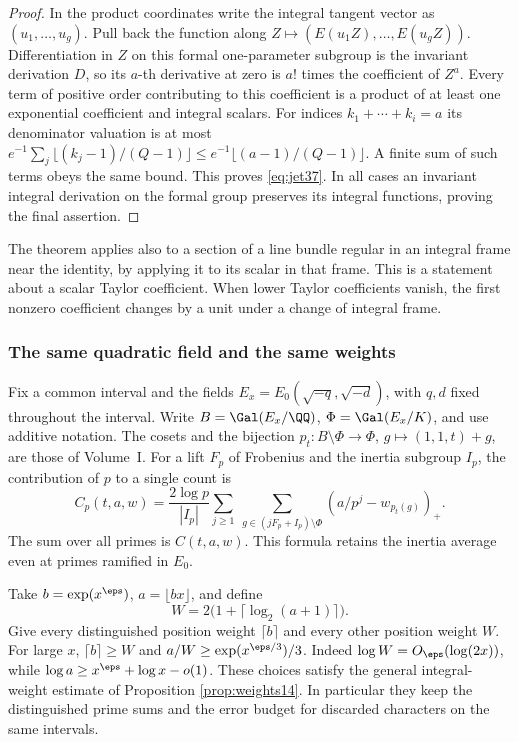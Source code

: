 \documentclass[a4paper,11pt]{article}
\theoremstyle{definition}
\theoremstyle{remark}
\numberwithin{equation}{section}
\begin{document}
\begin{proof}
In the product coordinates write the integral tangent vector as \((u_1,\ldots,u_g)\). Pull back the function along \(Z\mapsto(E(u_1Z),\ldots,E(u_g Z))\). Differentiation in \(Z\) on this formal one-parameter subgroup is the invariant derivation \(D\), so its \(a\)-th derivative at zero is \(a!\) times the coefficient of \(Z^a\). Every term of positive order contributing to this coefficient is a product of at least one exponential coefficient and integral scalars. For indices \(k_1+\cdots+k_i=a\) its denominator valuation is at most \(e^{-1}\sum_j\lfloor(k_j-1)/(Q-1)\rfloor\le e^{-1}\lfloor(a-1)/(Q-1)\rfloor\). A finite sum of such terms obeys the same bound. This proves \eqref{eq:jet37}. In all cases an invariant integral derivation on the formal group preserves its integral functions, proving the final assertion.
\end{proof}

The theorem applies also to a section of a line bundle regular in an integral frame near the identity, by applying it to its scalar in that frame. This is a statement about a scalar Taylor coefficient. When lower Taylor coefficients vanish, the first nonzero coefficient changes by a unit under a change of integral frame.

\subsubsection{The same quadratic field and the same weights}\label{nav:V-02}
Fix a common interval and the fields \(E_x=E_0(\sqrt{-q},\sqrt{-d})\), with \(q,d\) fixed throughout the interval. Write \(B=\Gal(E_x/\QQ)\), \(\Phi=\Gal(E_x/K)\), and use additive notation. The cosets and the bijection \(p_t:B\setminus\Phi\to\Phi\), \(g\mapsto(1,1,t)+g\), are those of Volume~I. For a lift \(F_p\) of Frobenius and the inertia subgroup \(I_p\), the contribution of \(p\) to a single count is
\begin{equation}
 C_p(t,a,w)=\frac{2\log p}{|I_p|}
 \sum_{j\ge1}\ \sum_{g\in(jF_p+I_p)\setminus\Phi}
                         (a/p^j-w_{p_t(g)})_+ .                \label{eq:ct37}
\end{equation}
The sum over all primes is \(C(t,a,w)\). This formula retains the inertia average even at primes ramified in \(E_0\).

Take \(b=\exp(x^\eps)\), \(a=\lfloor bx\rfloor\), and define
\[
                W=2\big(1+\lceil\log_2(a+1)\rceil\big).
\]
Give every distinguished position weight \(\lceil b\rceil\) and every other position weight \(W\). For large \(x\), \(\lceil b\rceil\ge W\) and \(a/W\ge\exp(x^{\eps/3})/3\). Indeed \(\log W=O_\eps(\log(2x))\), while \(\log a\ge x^\eps+\log x-o(1)\). These choices satisfy the general integral-weight estimate of Proposition \ref{prop:weights14}. In particular they keep the distinguished prime sums and the error budget for discarded characters on the same intervals.
\end{document}

